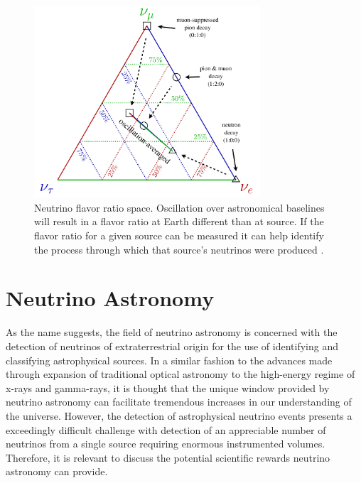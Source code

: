 \documentclass{gatech-thesis}
\begin{document}
\begin{figure}[ht]
  \begin{center}
    \includegraphics[width=0.75\textwidth,keepaspectratio]{AstroBaselineOsc.png}
  \end{center}
  \caption{Neutrino flavor ratio space. Oscillation over astronomical baselines will result in a flavor ratio at Earth different than at source. If the flavor ratio for a given source can be measured it can help identify the process through which that source's neutrinos were produced \cite{2014arXiv1412.5106I}.}
  \label{fig:baseline_osc}
\end{figure}

\chapter{Neutrino Astronomy}
As the name suggests, the field of neutrino astronomy is concerned with the detection of neutrinos of extraterrestrial origin for the use of identifying and classifying astrophysical sources. In a similar fashion to the advances made through expansion of traditional optical astronomy to the high-energy regime of x-rays and gamma-rays, it is thought that the unique window provided by neutrino astronomy can facilitate tremendous increases in our understanding of the universe. However, the detection of astrophysical neutrino events presents a exceedingly difficult challenge with detection of an appreciable number of neutrinos from a single source requiring enormous instrumented volumes. Therefore, it is relevant to discuss the potential scientific rewards neutrino astronomy can provide.
\end{document}
